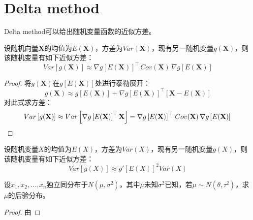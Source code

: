 \section{Delta method}
Delta method可以给出随机变量函数的近似方差。
\begin{theorem}\label{sec:deltamethod}
	设随机向量$\mathbf{X}$的均值为$E(\mathbf{X})$，方差为$Var(\mathbf{X})$，现有另一随机变量$g(\mathbf{X})$，则该随机变量有如下近似方差：
	\begin{equation*}
		Var[g(\mathbf{X})] \approx \nabla g\left[ E(\mathbf{X})\right] ^\top \, Cov(\mathbf{X}) \, \nabla g\left[E(\mathbf{X})\right] 
	\end{equation*}
\end{theorem}
\begin{proof}
	将$g(\mathbf{X})$在$g\left[E(\mathbf{X})\right]$处进行泰勒展开：
	\begin{equation*}
		g(\mathbf{X})\approx g\left[E(\mathbf{X})\right]+
		\nabla g\left[E(\mathbf{X})\right]^\top\left[\mathbf{X}-E(\mathbf{X})\right]
	\end{equation*}
	对此式求方差：
	\begin{equation*}
		Var\left[g(\mathbf{X})\right]\approx Var\left[ \nabla g\left[E(\mathbf{X})\right]^\top\mathbf{X}\right]=\nabla g\left[ E(\mathbf{X})\right] ^\top \, Cov(\mathbf{X}) \, \nabla g\left[E(\mathbf{X})\right]\qedhere
	\end{equation*}
\end{proof}
\begin{corollary}
	设随机变量$X$的均值为$E(X)$，方差为$Var(X)$，现有另一随机变量$g(X)$，则该随机变量有如下近似方差：
	\begin{equation*}
		Var\left[g(X)\right]\approx g'\left[E(X)\right]^2Var(X)
	\end{equation*}
\end{corollary}

\begin{theorem}
	设$x_1,x_2,\dots,x_n$独立同分布于$N(\mu,\sigma^2)$，其中$\mu$未知$\sigma^2$已知，若$\mu\sim N(\theta,\tau^2)$，求$\mu$的后验分布。
\end{theorem}
\begin{proof}
	由
\end{proof}